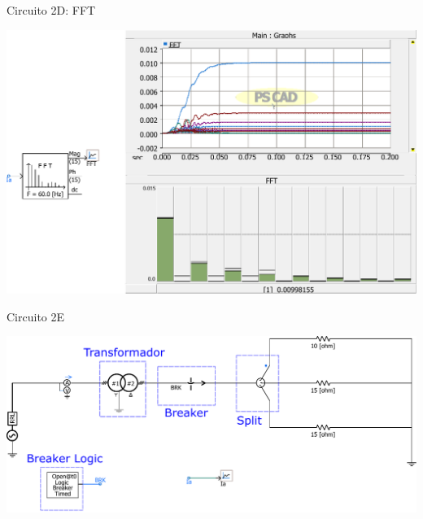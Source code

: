 \begin{frame}{Circuito 2D: FFT}
\centering


\includegraphics[width=0.70\linewidth]{./figuras/Segundo-Circuito/SIM2d-FFT}

\end{frame}




\begin{frame}{Circuito 2E}
\centering


\includegraphics[width=0.70\linewidth]{./figuras/Segundo-Circuito/SIM2e}

\end{frame}
